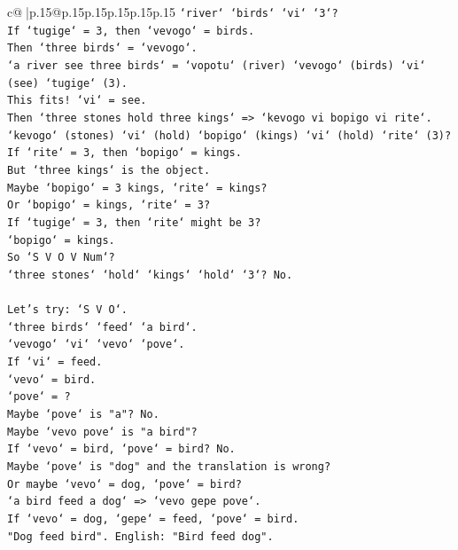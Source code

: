 \documentclass{article}
\begin{document}
{\begin{supertabular}{c@{$\;$}|p{.15\linewidth}@{}p{.15\linewidth}p{.15\linewidth}p{.15\linewidth}p{.15\linewidth}p{.15\linewidth}}
{{{\texttt{`river` `birds` `vi` `3`?} \\
\texttt{If `tugige` = 3, then `vevogo` = birds.} \\
\texttt{Then `three birds` = `vevogo`.} \\
\texttt{`a river see three birds` = `vopotu` (river) `vevogo` (birds) `vi` (see) `tugige` (3).} \\
\texttt{This fits! `vi` = see.} \\
\texttt{Then `three stones hold three kings` => `kevogo vi bopigo vi rite`.} \\
\texttt{`kevogo` (stones) `vi` (hold) `bopigo` (kings) `vi` (hold) `rite` (3)?} \\
\texttt{If `rite` = 3, then `bopigo` = kings.} \\
\texttt{But `three kings` is the object.} \\
\texttt{Maybe `bopigo` = 3 kings, `rite` = kings?} \\
\texttt{Or `bopigo` = kings, `rite` = 3?} \\
\texttt{If `tugige` = 3, then `rite` might be 3?} \\
\texttt{`bopigo` = kings.} \\
\texttt{So `S V O V Num`?} \\
\texttt{`three stones` `hold` `kings` `hold` `3`? No.} \\
\\ 
\texttt{Let's try: `S V O`.} \\
\texttt{`three birds` `feed` `a bird`.} \\
\texttt{`vevogo` `vi` `vevo` `pove`.} \\
\texttt{If `vi` = feed.} \\
\texttt{`vevo` = bird.} \\
\texttt{`pove` = ?} \\
\texttt{Maybe `pove` is "a"? No.} \\
\texttt{Maybe `vevo pove` is "a bird"?} \\
\texttt{If `vevo` = bird, `pove` = bird? No.} \\
\texttt{Maybe `pove` is "dog" and the translation is wrong?} \\
\texttt{Or maybe `vevo` = dog, `pove` = bird?} \\
\texttt{`a bird feed a dog` => `vevo gepe pove`.} \\
\texttt{If `vevo` = dog, `gepe` = feed, `pove` = bird.} \\
\texttt{"Dog feed bird". English: "Bird feed dog".} \\
}}}
\end{supertabular}}
\end{document}
